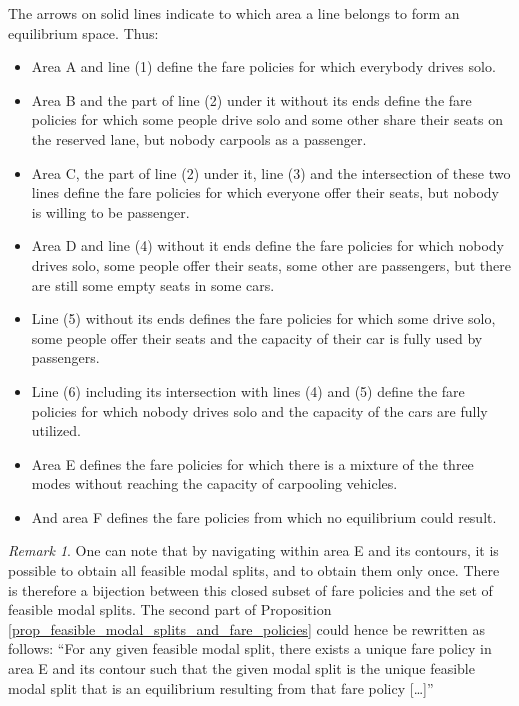 \documentclass[english, a4paper]{article}
\theoremstyle{plain}
\theoremstyle{definition}
\theoremstyle{remark}
\newtheorem{remark}{Remark}
\begin{document}
The arrows on solid lines indicate to which area a line belongs to form an equilibrium space. Thus: \begin{itemize}
    \item Area A and line (1) define the fare policies for which everybody drives solo.
    \item Area B and the part of line (2) under it without its ends define the fare policies for which some people drive solo and some other share their seats on the reserved lane, but nobody carpools as a passenger.
    \item Area C, the part of line (2) under it, line (3) and the intersection of these two lines define the fare policies for which everyone offer their seats, but nobody is willing to be passenger.
    \item Area D and line (4) without it ends define the fare policies for which nobody drives solo, some people offer their seats, some other are passengers, but there are still some empty seats in some cars.
    \item Line (5) without its ends defines the fare policies for which some drive solo, some people offer their seats and the capacity of their car is fully used by passengers.
    \item Line (6) including its intersection with lines (4) and (5) define the fare policies for which nobody drives solo and the capacity of the cars are fully utilized.
    \item Area E defines the fare policies for which there is a mixture of the three modes without reaching the capacity of carpooling vehicles.
    \item And area F defines the fare policies from which no equilibrium could result.
\end{itemize}

\begin{remark}
    One can note that by navigating within area E and its contours, it is possible to obtain all feasible modal splits, and to obtain them only once. There is therefore a bijection between this closed subset of fare policies and the set of feasible modal splits. The second part of Proposition \ref{prop_feasible_modal_splits_and_fare_policies} could hence be rewritten as follows: ``For any given feasible modal split, there exists a unique fare policy in area E and its contour such that the given modal split is the unique feasible modal split that is an equilibrium resulting from that fare policy […]''
\end{remark}
\end{document}
